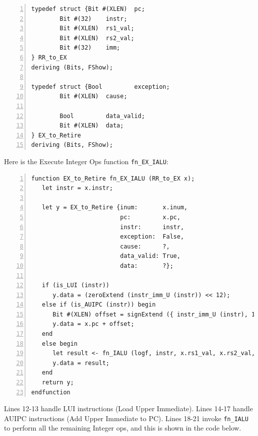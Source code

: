 {\small
\begin{Verbatim}[frame=single, numbers=left]
typedef struct {Bit #(XLEN)  pc;
		Bit #(32)    instr;
		Bit #(XLEN)  rs1_val;
		Bit #(XLEN)  rs2_val;
		Bit #(32)    imm;
} RR_to_EX
deriving (Bits, FShow);

typedef struct {Bool         exception;
		Bit #(XLEN)  cause;

		Bool         data_valid;
		Bit #(XLEN)  data;
} EX_to_Retire
deriving (Bits, FShow);
\end{Verbatim}
}

Here is the Execute Integer Ops function \verb|fn_EX_IALU|:

{\small
\begin{Verbatim}[frame=single, numbers=left]
function EX_to_Retire fn_EX_IALU (RR_to_EX x);
   let instr = x.instr;

   let y = EX_to_Retire {inum:       x.inum,
                         pc:         x.pc,
                         instr:      instr,
                         exception:  False,
                         cause:      ?,
                         data_valid: True,
                         data:       ?};

   if (is_LUI (instr))
      y.data = (zeroExtend (instr_imm_U (instr)) << 12);
   else if (is_AUIPC (instr)) begin
      Bit #(XLEN) offset = signExtend ({ instr_imm_U (instr), 12'b0 });
      y.data = x.pc + offset;
   end
   else begin
      let result <- fn_IALU (logf, instr, x.rs1_val, x.rs2_val, x.imm);
      y.data = result;
   end
   return y;
endfunction
\end{Verbatim}
}

Lines 12-13 handle LUI instructions (Load Upper Immediate).  Lines
14-17 handle AUIPC instructions (Add Upper Immediate to PC).  Lines
18-21 invoke {\tt fn\_IALU} to perform all the remaining Integer ops,
and this is shown in the code below.

